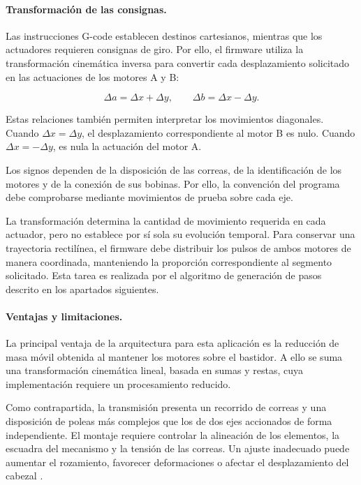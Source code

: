 \documentclass[blue,fullpaper]{ludusofficial}  %
\begin{document}
\paragraph{Transformación de las consignas.}

Las instrucciones G-code establecen
destinos cartesianos, mientras que los
actuadores requieren consignas de giro.
Por ello, el firmware utiliza la
transformación cinemática inversa
para convertir cada desplazamiento
solicitado en las actuaciones de
los motores A y B:

\begin{equation}
    \Delta a = \Delta x + \Delta y,
    \qquad
    \Delta b = \Delta x - \Delta y.
    \label{eq:corexy-inversa}
\end{equation}

Estas relaciones también permiten
interpretar los movimientos diagonales.
Cuando $\Delta x = \Delta y$,
el desplazamiento correspondiente
al motor B es nulo. Cuando
$\Delta x = -\Delta y$, es nula
la actuación del motor A.

Los signos dependen de la disposición
de las correas, de la identificación
de los motores y de la conexión
de sus bobinas. Por ello, la convención
del programa debe comprobarse mediante
movimientos de prueba sobre cada eje.

La transformación determina la cantidad
de movimiento requerida en cada actuador,
pero no establece por sí sola su evolución
temporal. Para conservar una trayectoria
rectilínea, el firmware debe distribuir
los pulsos de ambos motores de manera
coordinada, manteniendo la proporción
correspondiente al segmento solicitado.
Esta tarea es realizada por el algoritmo
de generación de pasos descrito
en los apartados siguientes.

\paragraph{Ventajas y limitaciones.}

La principal ventaja de la arquitectura
para esta aplicación es la reducción
de masa móvil obtenida al mantener
los motores sobre el bastidor.
A ello se suma una transformación
cinemática lineal, basada en sumas
y restas, cuya implementación requiere
un procesamiento reducido.

Como contrapartida, la transmisión
presenta un recorrido de correas
y una disposición de poleas más
complejos que los de dos ejes
accionados de forma independiente.
El montaje requiere controlar
la alineación de los elementos,
la escuadra del mecanismo y
la tensión de las correas.
Un ajuste inadecuado puede aumentar
el rozamiento, favorecer deformaciones
o afectar el desplazamiento del cabezal
\cite{corexy_ajuste}.
\end{document}
